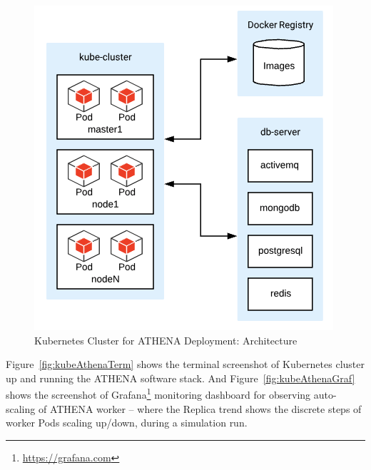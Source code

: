 \begin{figure}[H]
\centering
\includegraphics[width=0.4\paperwidth]{Figures/ATHENA_Kube_cluster}
\decoRule
\caption[Kubernetes Cluster for ATHENA Deployment: Architecture]{Kubernetes Cluster for ATHENA Deployment: Architecture}
\label{fig:kubeAthenaArch}
\end{figure}

Figure~\ref{fig:kubeAthenaTerm} shows the terminal screenshot of Kubernetes cluster up and running the ATHENA software stack. And Figure~\ref{fig:kubeAthenaGraf} shows the screenshot of Grafana\footnote{\url{https://grafana.com}} monitoring dashboard for observing  auto-scaling of ATHENA worker -- where the Replica trend shows the discrete steps of worker Pods scaling up/down, during a simulation run.

